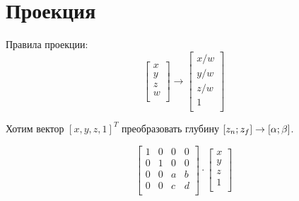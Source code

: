 \section{Проекция}
Правила проекции:
\[
    \begin{bmatrix}
        x \\
        y \\
        z \\
        w \\
    \end{bmatrix}
    \to
    \begin{bmatrix}
        x / w \\
        y / w \\
        z / w \\
        1 \\
    \end{bmatrix}
\]

Хотим вектор $[x, y, z, 1]^T$
преобразовать глубину
$[z_n; z_f] \to [\alpha; \beta]$.

\[
    \begin{bmatrix}
        1 & 0 & 0 & 0 \\
        0 & 1 & 0 & 0 \\
        0 & 0 & a & b \\
        0 & 0 & c & d \\
    \end{bmatrix}
    \cdot
    \begin{bmatrix}
        x \\
        y \\
        z \\
        1 \\
    \end{bmatrix}
\]

